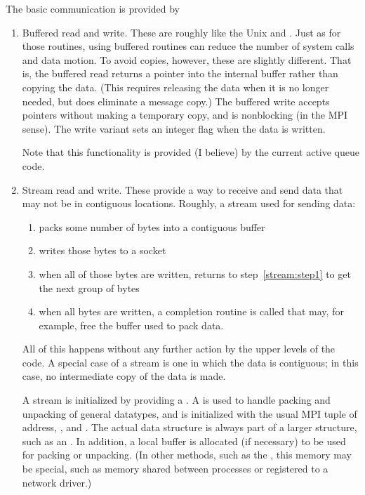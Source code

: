 The basic communication is provided by
\begin{enumerate}
\item Buffered read and write.  These are roughly like the Unix 
  and .  Just as for those routines, using buffered routines can
  reduce the number of system calls and data motion.  
  To avoid copies, however, these are slightly different.
  That is, the buffered read
  returns a pointer into the internal buffer rather than copying the
  data.
  (This requires releasing the data when it is no longer needed, but
  does eliminate a message copy.)
  The buffered write accepts
  pointers without making a temporary copy, and is nonblocking (in the
  MPI sense).  The write variant sets an integer
  flag when the data is written.

  Note that this functionality is provided (I believe) by the current active
  queue code.

\item Stream read and write.  These provide a way to receive and send data that
  may not be in contiguous locations.  Roughly, a stream used for
  sending data:
    \begin{enumerate}
    \item packs some number of bytes into a contiguous
      buffer\label{stream:step1} 
    \item writes those bytes to a socket
    \item when all of those bytes are written, returns to
      step~\ref{stream:step1} to 
    get the next group of bytes
    \item when all bytes are written, a completion routine is called
    that may, for example, free the buffer used to pack data.
    \end{enumerate}

    All of this happens without any further action by the upper levels
    of the code.  A special case of a stream is one in which the data
    is contiguous; in this case, no intermediate copy of the data is
    made.

    A stream is initialized by providing a .  A
     is used to handle packing and unpacking of general 
    datatypes, and is initialized with the usual MPI tuple of
     address, , and .  The
    actual  data structure is always part of a larger 
    structure, such as an .  In addition, 
    a local buffer is allocated (if necessary) to be used for packing
    or unpacking.  (In other methods, such as the \shmemname, this
    memory may be special, such as memory shared between processes or
    registered to a network driver.)  


\end{enumerate}
